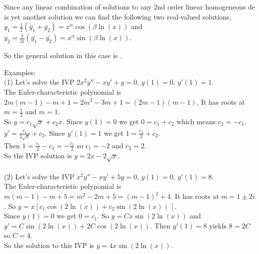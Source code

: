 \documentclass{ximera}
\begin{document}
 Since any linear combination of solutions to any 2nd order linear homogeneous de is yet another solution we can find the following two real-valued solutions,\\  $\displaystyle y_1=\frac{1}{2}\left(\bar{y_1}+\bar{y_2}\right)=x^{\alpha}\cos{\left(\beta \ln{(x)}\right)}$ and $\displaystyle y_2=\frac{1}{2i}\left(\bar{y_1}-\bar{y_2}\right)=x^{\alpha}\sin{\left(\beta \ln{(x)}\right)}$.

So the general solution in this case is .



\newpage

Examples:\\

(1) Let's solve the IVP $2x^2 y'' -xy'+y=0$, $y(1)=0$, $y'(1)=1$.\\

The Euler-characteristic polynomial is $2m(m-1)-m+1=2m^2-3m+1=(2m-1)(m-1)$.  It has roots at $m=\frac{1}{2}$ and $m=1$.\\

So $y=c_1 \sqrt{x}+c_2 x$.  Since $y(1)=0$ we get $0=c_1+c_2$ which means $c_2=-c_1$.  \\

$\displaystyle y'=\frac{c_1}{2\sqrt{x}}+c_2$.  Since $y'(1)=1$ we get $\displaystyle 1=\frac{c_1}{2}+c_2$. \\

 Then $\displaystyle 1= \frac{c_1}{2}-c_1=-\frac{c_1}{2}$ so $c_1=-2$ and $c_2=2$.\\

So the IVP solution is $y=2x-2\sqrt{x}$.\\ \\

(2) Let's solve the IVP $x^2 y''-xy'+5y=0$, $y(1)=0$, $y'(1)=8$.\\

The Euler-characteristic polynomial is $m(m-1)-m+5=m^2-2m+5=(m-1)^2+4$.  It has roots at $m=1\pm 2i$.  So $y=x\left[c_1\cos{\left(2\ln{(x)}\right)}+c_2\sin{\left(2\ln{(x)}\right)}\,\right]$.\\

Since $y(1)=0$ we get $0=c_1$.  So $y=Cx\sin{\left(2\ln{(x)}\right)}$ and $y'=C\sin{\left(2\ln{(x)}\right)}+2C\cos{\left(2\ln{(x)}\right)}$.  Then $y'(1)=8$ yields $8=2C$ so $C=4$.\\

So the solution to this IVP is $y=4x\sin{\left(2\ln{(x)}\right)}$.
\end{document}
